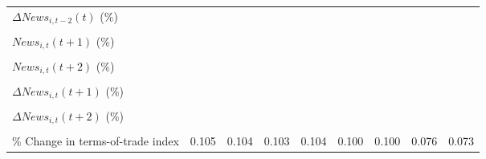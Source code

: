 {\begin{tabular}{l*{8}{c}}
\addlinespace
$ \Delta News_{i,t-2}(t)$ (\%)&                     &                     &                     &                     &                     &                     &                     &                     \\
                    &                     &                     &                     &                     &                     &                     &                     &                     \\
\addlinespace
$ News_{i,t}(t+1)$ (\%)&                     &                     &                     &                     &                     &                     &                     &                     \\
                    &                     &                     &                     &                     &                     &                     &                     &                     \\
\addlinespace
$ News_{i,t}(t+2)$ (\%)&                     &                     &                     &                     &                     &                     &                     &                     \\
                    &                     &                     &                     &                     &                     &                     &                     &                     \\
\addlinespace
$ \Delta News_{i,t}(t+1)$ (\%)&                     &                     &                     &                     &                     &                     &                     &                     \\
                    &                     &                     &                     &                     &                     &                     &                     &                     \\
\addlinespace
$ \Delta News_{i,t}(t+2)$ (\%)&                     &                     &                     &                     &                     &                     &                     &                     \\
                    &                     &                     &                     &                     &                     &                     &                     &                     \\
\addlinespace
\% Change in terms-of-trade index&       0.105\sym{*}  &       0.104\sym{*}  &       0.103\sym{*}  &       0.104\sym{*}  &       0.100\sym{*}  &       0.100\sym{*}  &       0.076         &       0.073         \\

\end{tabular}}
